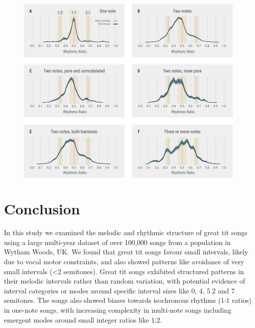 \begin{figure}[hb!]
    \centering
    \includegraphics[width=\linewidth]{figures/chapter_5/rhythmic-songtypes.pdf}
    \label{c5_fig:rhythmic-songtypes}
\end{figure}

\section{Conclusion} 
In this study we examined the melodic and rhythmic structure of great tit songs using a large multi-year dataset of over 100,000 songs from a population in Wytham Woods, UK. We found that great tit songs favour small intervals, likely due to vocal motor constraints, and also showed patterns like avoidance of very small intervals (<2 semitones). Great tit songs exhibited structured patterns in their melodic intervals rather than random variation, with potential evidence of interval categories or modes around specific interval sizes like 0, 4, 5.2 and 7 semitones. The songs also showed biases towards isochronous rhythms (1:1 ratios) in one-note songs, with increasing complexity in multi-note songs including emergent modes around small integer ratios like 1:2.

